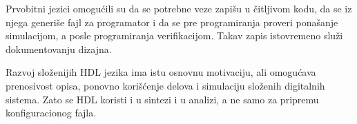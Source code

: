 Prvobitni jezici omogućili su da se potrebne veze zapišu u čitljivom kodu, da se iz njega generiše fajl za programator i da se pre programiranja proveri ponašanje simulacijom, a posle programiranja verifikacijom. Takav zapis istovremeno služi dokumentovanju dizajna.

Razvoj složenijih HDL jezika ima istu osnovnu motivaciju, ali omogućava prenosivost opisa, ponovno korišćenje delova i simulaciju složenih digitalnih sistema. Zato se HDL koristi i u sintezi i u analizi, a ne samo za pripremu konfiguracionog fajla.
